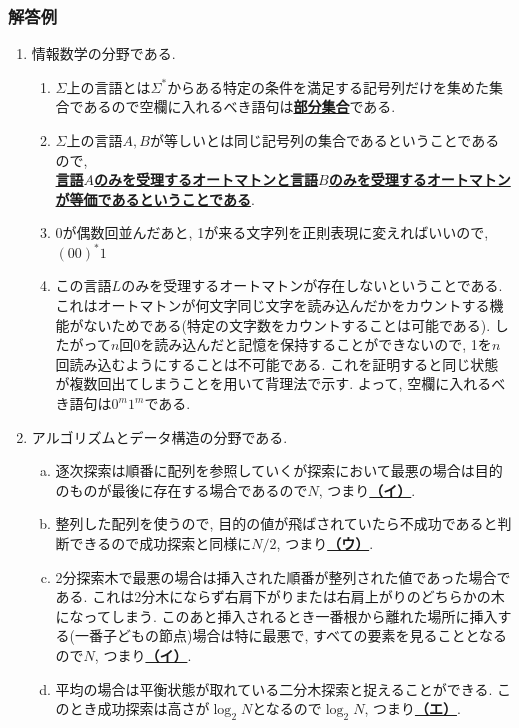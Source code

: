 \documentclass[dvipdfmx,titlepage, 11pt, a4paper]{jsarticle}%
\begin{document}
\subsubsection{解答例}
\begin{enumerate}[(1)]
  \setlength{\itemsep}{15pt}   
\item 情報数学の分野である.
  \begin{enumerate}[({1}$-$a)]
    \setlength{\itemsep}{15pt}   
  \item $\Sigma$上の言語とは$\Sigma^{\ast}$からある特定の条件を満足する記号列だけを集めた集合であるので空欄に入れるべき語句は\underline{\bf 部分集合}である.
  \item $\Sigma$上の言語$A,B$が等しいとは同じ記号列の集合であるということであるので, \\\underline{\bf 言語$A$のみを受理するオートマトンと言語$B$のみを受理するオートマトンが等価であるということである}.
  \item 0が偶数回並んだあと, 1が来る文字列を正則表現に変えればいいので, \underline{\bf $(00)^{\ast}1$}
  \item この言語$L$のみを受理するオートマトンが存在しないということである. これはオートマトンが何文字同じ文字を読み込んだかをカウントする機能がないためである(特定の文字数をカウントすることは可能である). したがって$n$回0を読み込んだと記憶を保持することができないので, 1を$n$回読み込むようにすることは不可能である. これを証明すると同じ状態が複数回出てしまうことを用いて背理法で示す. よって, 空欄に入れるべき語句は\underline{\bf $0^{m}1^{m}$}である.
  \end{enumerate}
\item アルゴリズムとデータ構造の分野である.
  \begin{enumerate}[(a)]
  \item 逐次探索は順番に配列を参照していくが探索において最悪の場合は目的のものが最後に存在する場合であるので$N$, つまり\underline{\bf （イ）}.
  \item 整列した配列を使うので, 目的の値が飛ばされていたら不成功であると判断できるので成功探索と同様に$N/2$, つまり\underline{\bf （ウ）}.
  \item 2分探索木で最悪の場合は挿入された順番が整列された値であった場合である. これは2分木にならず右肩下がりまたは右肩上がりのどちらかの木になってしまう. このあと挿入されるとき一番根から離れた場所に挿入する(一番子どもの節点)場合は特に最悪で, すべての要素を見ることとなるので$N$, つまり\underline{\bf （イ）}.
  \item 平均の場合は平衡状態が取れている二分木探索と捉えることができる. このとき成功探索は高さが$\log_{2}N$となるので$\log_{2}N$, つまり\underline{\bf （エ）}.

\end{enumerate}
\end{enumerate}
\end{document}
